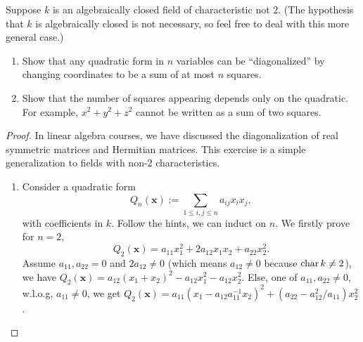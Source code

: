 \begin{exr}\label{chap5exr:quadratic_forms_diagonalization}
Suppose $k$ is an algebraically closed field of characteristic not $2$. (The hypothesis that $k$ is algebraically closed is not necessary, so feel free to deal with this more general case.)
\begin{enumerate}[label=(\alph*)]
\item Show that any quadratic form in $n$ variables can be ``diagonalized'' by changing coordinates to be a sum of at most $n$ squares.
\item Show that the number of squares appearing depends only on the quadratic. For example, $x^2 + y^2 + z^2$ cannot be written as a sum of two squares.
\end{enumerate}
\end{exr}
\begin{proof}
In linear algebra courses, we have discussed the diagonalization of real symmetric matrices and Hermitian matrices. This exercise is a simple generalization to fields with non-2 characteristics.
\begin{enumerate}[label=(\alph*)]
\item Consider a quadratic form 
$$
Q_{n}(\mathbf{x}):=\sum_{1\leq i,j\leq n}a_{ij}x_ix_j,
$$
with coefficients in $k$.
Follow the hints, we can induct on $n$. We firstly prove for $n=2$,
$$
Q_2(\mathbf{x})=a_{11}x_1^2+2a_{12}x_1x_2+a_{22}x_2^2.
$$
Assume $a_{11},a_{22}=0$ and $2a_{12}\neq 0$ (which means $a_{12}\neq 0$ because $\text{char\,} k\neq 2$), we have $Q_{2}(\mathbf{x})=a_{12}(x_1+x_2)^2-a_{12}x_1^2-a_{12}x_2^2$. Else, one of $a_{11},a_{22}\neq 0$, w.l.o.g, $a_{11}\neq 0$, we get $Q_2(\mathbf{x})=a_{11}(x_1-a_{12}a_{11}^{-1}x_2)^2+(a_{22}-a_{12}^2/a_{11})x_2^2$.


\end{enumerate}
\end{proof}
